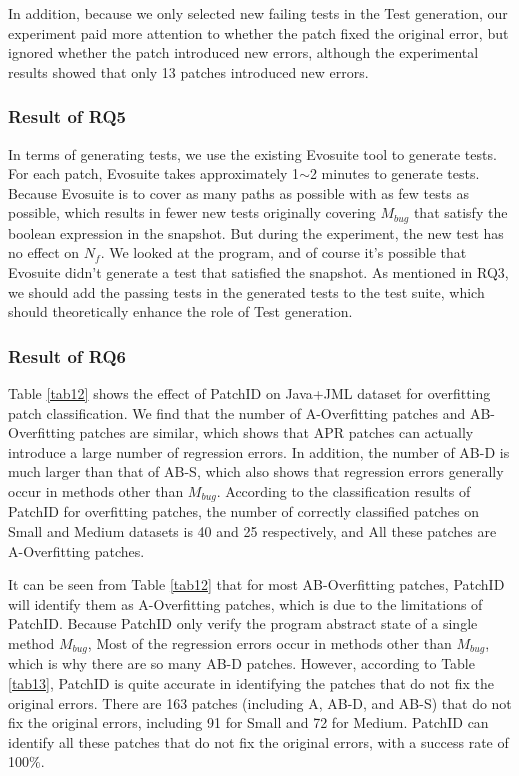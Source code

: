 \documentclass[sn-basic]{sn-jnl}
\theoremstyle{thmstyleone}
\theoremstyle{thmstyletwo}
\theoremstyle{thmstylethree}
\begin{document}
In addition, because we only selected new failing tests in the Test generation, our experiment paid more attention to whether the patch fixed the original error, but ignored whether the patch introduced new errors, although the experimental results showed that only 13 patches introduced new errors.

\subsubsection{Result of RQ5}
In terms of generating tests, we use the existing Evosuite tool to generate tests. For each patch, Evosuite takes approximately 1$\sim$2 minutes to generate tests. Because Evosuite is to cover as many paths as possible with as few tests as possible, which results in fewer new tests originally covering $M_{bug}$ that satisfy the boolean expression in the snapshot. But during the experiment, the new test has no effect on $N_f$. We looked at the program, and of course it's possible that Evosuite didn't generate a test that satisfied the snapshot. As mentioned in RQ3, we should add the passing tests in the generated tests to the test suite, which should theoretically enhance the role of Test generation.

\subsubsection{Result of RQ6}
Table \ref{tab12} shows the effect of PatchID on Java+JML dataset for overfitting patch classification. We find that the number of A-Overfitting patches and AB-Overfitting patches are similar, which shows that APR patches can actually introduce a large number of regression errors. In addition, the number of AB-D is much larger than that of AB-S, which also shows that regression errors generally occur in methods other than $M_{bug}$. According to the classification results of PatchID for overfitting patches, the number of correctly classified patches on Small and Medium datasets is 40 and 25 respectively, and All these patches are A-Overfitting patches.

It can be seen from Table \ref{tab12} that for most AB-Overfitting patches, PatchID will identify them as A-Overfitting patches, which is due to the limitations of PatchID. Because PatchID only verify the program abstract state of a single method $M_{bug}$, Most of the regression errors occur in methods other than $M_{bug}$, which is why there are so many AB-D patches. However, according to Table \ref{tab13}, PatchID is quite accurate in identifying the patches that do not fix the original errors. There are 163 patches (including A, AB-D, and AB-S) that do not fix the original errors, including 91 for Small and 72 for Medium. PatchID can identify all these patches that do not fix the original errors, with a success rate of 100$\%$.
\end{document}
